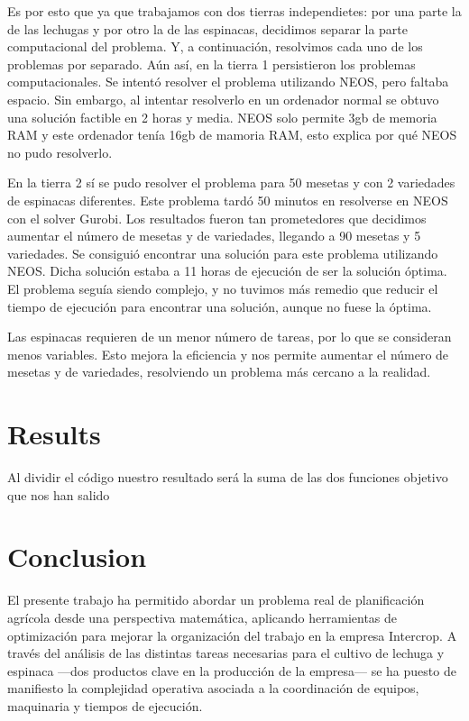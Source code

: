 Es por esto que ya que trabajamos con dos tierras independietes: por una parte la de las lechugas y por otro la de las espinacas, 
decidimos separar la parte computacional del problema. Y, a continuación, resolvimos cada uno de los problemas por separado. Aún así, en la tierra 1 persistieron los problemas computacionales.
 Se intentó resolver el problema utilizando NEOS, pero faltaba espacio. Sin embargo, al intentar resolverlo en un ordenador normal 
 se obtuvo una solución factible en 2 horas y media. NEOS solo permite 3gb de memoria RAM y este ordenador tenía 16gb de mamoria RAM,
  esto explica por qué NEOS no pudo resolverlo. 

En la tierra 2 sí se pudo resolver el problema para 50 mesetas y con 2 variedades de espinacas diferentes. Este problema tardó 
50 minutos en resolverse en NEOS con el solver Gurobi. Los resultados fueron tan prometedores que decidimos aumentar el número de
 mesetas y de variedades, llegando a 90 mesetas y 5 variedades. Se consiguió encontrar una solución para este problema utilizando
  NEOS. Dicha solución estaba a 11 horas de ejecución de ser la solución óptima. El problema seguía siendo complejo, y no tuvimos más remedio que reducir el tiempo de ejecución para encontrar una solución, aunque no fuese la óptima. 

Las espinacas requieren de un menor número de tareas, por lo que se consideran menos variables. Esto mejora la eficiencia 
 y nos permite aumentar el número de mesetas y de variedades, resolviendo un problema más cercano a la realidad. 

\chapter*{Results}
Al dividir el código nuestro resultado será la suma de las dos funciones objetivo que nos han salido

\chapter*{Conclusion}
El presente trabajo ha permitido abordar un problema real de planificación agrícola desde una perspectiva matemática,
aplicando herramientas de optimización para mejorar la organización del trabajo en la empresa Intercrop.
A través del análisis de las distintas tareas necesarias para el cultivo de lechuga y espinaca —dos productos clave en la producción de la empresa—
se ha puesto de manifiesto la complejidad operativa asociada a la coordinación de equipos, maquinaria y tiempos de ejecución.

